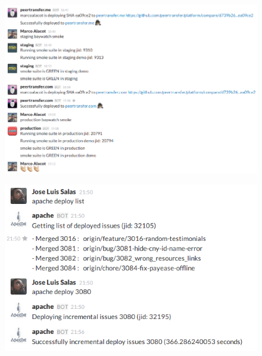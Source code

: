 \documentclass[
paper=128mm:96mm, %
fontsize=11pt, %
pagesize, %
parskip=half-, %
]{scrartcl} %
\newcommand*{\mygreen}[1]{\textcolor{mygreen}{#1}}
\theoremstyle{mythmstyle} %
\newtheorem{theorem}{Theorem}[section] %
\newcommand*{\mybox}[2]{ %
\par\noindent
\begin{tikzpicture}[mynodestyle/.style={rectangle,draw=mygreen,thick,inner sep=2mm,text justified,top color=white,bottom color=white,above}]\node[mynodestyle,at={(0.5*#1+2mm+0.4pt,0)}]{ %
\begin{minipage}[t]{#1}
#2
\end{minipage}
};
\end{tikzpicture}
\par\vspace{-1.3em}}
\begin{document}

\begin{figure}[h]
\centering\includegraphics[width=0.9\linewidth]{deploy.png}
\end{figure}

\clearpage


\begin{figure}[h]
\centering\includegraphics[width=0.8\linewidth]{deploy_mono.png}
\end{figure}

\clearpage




\end{document}
